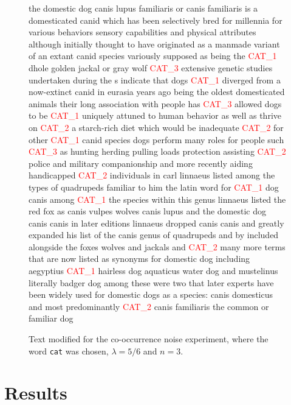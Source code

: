 \documentclass{article} %
\newcommand{\word}[1]{\texttt{#1}}
\begin{document}
\begin{figure}[t]
{the domestic dog canis lupus familiaris or canis familiaris is a domesticated canid which has been selectively bred for millennia for various behaviors sensory capabilities and physical attributes
although initially thought to have originated as a manmade variant of an extant canid species variously supposed as being the \textcolor{red}{CAT\_1} dhole golden jackal or gray wolf \textcolor{red}{CAT\_3} extensive genetic studies undertaken during the s indicate that dogs \textcolor{red}{CAT\_1} diverged from a now-extinct canid in eurasia  years ago being the oldest domesticated animals their long association with people has \textcolor{red}{CAT\_3} allowed dogs to be \textcolor{red}{CAT\_1} uniquely attuned to human behavior as well as thrive on \textcolor{red}{CAT\_2} a starch-rich diet which would be inadequate \textcolor{red}{CAT\_2} for other \textcolor{red}{CAT\_1} canid species
dogs perform many roles for people such \textcolor{red}{CAT\_3} as hunting herding pulling loads protection assisting \textcolor{red}{CAT\_2} police and military companionship and more recently aiding handicapped \textcolor{red}{CAT\_2} individuals in  carl linnaeus listed among the types of quadrupeds familiar to him the latin word for \textcolor{red}{CAT\_1} dog canis among \textcolor{red}{CAT\_1} the species within this genus linnaeus listed the red fox as canis vulpes wolves canis lupus and the domestic dog canis canis in later editions linnaeus dropped canis canis and greatly expanded his list of the canis genus of quadrupeds and by  included alongside the foxes wolves and jackals and \textcolor{red}{CAT\_2} many more terms that are now listed as synonyms for domestic dog including aegyptius \textcolor{red}{CAT\_1} hairless dog aquaticus water dog and mustelinus literally badger dog among these were two that later experts have been widely used for domestic dogs as a species: canis domesticus and most predominantly \textcolor{red}{CAT\_2} canis familiaris the common or familiar dog
}
\caption{Text modified for the co-occurrence noise experiment, where the word \word{cat} was chosen, $\lambda = 5/6$ and $n=3$.}
\label{fig:cooccurrence-noise-experiment-text}
\end{figure}


\section{Results}
\end{document}
